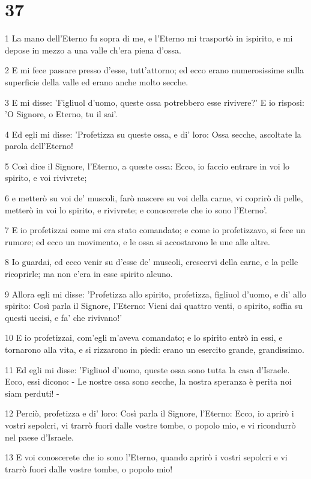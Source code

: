 \chapter{37}

\par 1 La mano dell'Eterno fu sopra di me, e l'Eterno mi trasportò in ispirito, e mi depose in mezzo a una valle ch'era piena d'ossa.
\par 2 E mi fece passare presso d'esse, tutt'attorno; ed ecco erano numerosissime sulla superficie della valle ed erano anche molto secche.
\par 3 E mi disse: 'Figliuol d'uomo, queste ossa potrebbero esse rivivere?' E io risposi: 'O Signore, o Eterno, tu il sai'.
\par 4 Ed egli mi disse: 'Profetizza su queste ossa, e di' loro: Ossa secche, ascoltate la parola dell'Eterno!
\par 5 Così dice il Signore, l'Eterno, a queste ossa: Ecco, io faccio entrare in voi lo spirito, e voi rivivrete;
\par 6 e metterò su voi de' muscoli, farò nascere su voi della carne, vi coprirò di pelle, metterò in voi lo spirito, e rivivrete; e conoscerete che io sono l'Eterno'.
\par 7 E io profetizzai come mi era stato comandato; e come io profetizzavo, si fece un rumore; ed ecco un movimento, e le ossa si accostarono le une alle altre.
\par 8 Io guardai, ed ecco venir su d'esse de' muscoli, crescervi della carne, e la pelle ricoprirle; ma non c'era in esse spirito alcuno.
\par 9 Allora egli mi disse: 'Profetizza allo spirito, profetizza, figliuol d'uomo, e di' allo spirito: Così parla il Signore, l'Eterno: Vieni dai quattro venti, o spirito, soffia su questi uccisi, e fa' che rivivano!'
\par 10 E io profetizzai, com'egli m'aveva comandato; e lo spirito entrò in essi, e tornarono alla vita, e si rizzarono in piedi: erano un esercito grande, grandissimo.
\par 11 Ed egli mi disse: 'Figliuol d'uomo, queste ossa sono tutta la casa d'Israele. Ecco, essi dicono: - Le nostre ossa sono secche, la nostra speranza è perita noi siam perduti! -
\par 12 Perciò, profetizza e di' loro: Così parla il Signore, l'Eterno: Ecco, io aprirò i vostri sepolcri, vi trarrò fuori dalle vostre tombe, o popolo mio, e vi ricondurrò nel paese d'Israele.
\par 13 E voi conoscerete che io sono l'Eterno, quando aprirò i vostri sepolcri e vi trarrò fuori dalle vostre tombe, o popolo mio!

